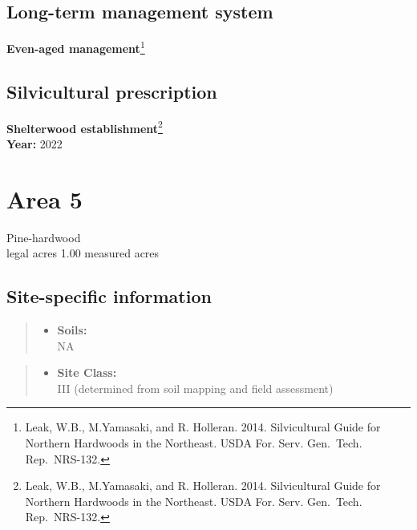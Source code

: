 \documentclass[]{tufte-handout}
\providecommand{\tightlist}{%
  \setlength{\itemsep}{0pt}\setlength{\parskip}{0pt}}
\begin{document}
\subsection{Long-term management
system}\label{long-term-management-system-3}

\textbf{Even-aged management}\footnote{Leak, W.B., M.Yamasaki, and R.
  Holleran. 2014. Silvicultural Guide for Northern Hardwoods in the
  Northeast. USDA For. Serv. Gen.~Tech. Rep.~NRS-132.}

\subsection{Silvicultural
prescription}\label{silvicultural-prescription-3}

\textbf{Shelterwood establishment}\footnote{Leak, W.B., M.Yamasaki, and
  R. Holleran. 2014. Silvicultural Guide for Northern Hardwoods in the
  Northeast. USDA For. Serv. Gen.~Tech. Rep.~NRS-132.}\\
\textbf{Year:} 2022

\newpage

\section{Area 5}\label{area-5}

Pine-hardwood\\
 legal acres \textbar{} 1.00 measured acres

\subsection{Site-specific
information}\label{site-specific-information-4}

\begin{quote}
\begin{itemize}
\tightlist
\item
  \textbf{Soils:}\\
  \indent\indent  NA
\end{itemize}
\end{quote}

\begin{quote}
\begin{itemize}
\tightlist
\item
  \textbf{Site Class:}\\
  \vspace{2pt} III (determined from soil mapping and field assessment)
\end{itemize}
\end{quote}
\end{document}
